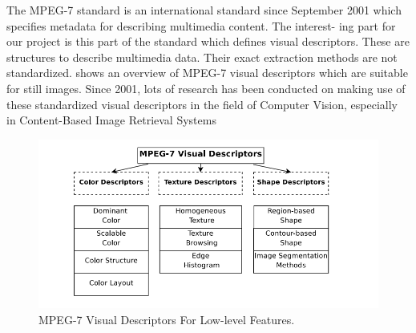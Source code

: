 The MPEG-7 standard\cite{Mpeg} is an international standard since September 2001
which speciﬁes metadata for describing multimedia content. The interest-
ing part for our project is this part of the standard which deﬁnes visual
descriptors. These are structures to describe multimedia data. Their exact
extraction methods are not standardized.  shows an overview of
MPEG-7 visual descriptors which are suitable for still images.
Since 2001, lots of research has been conducted on making use of these
standardized visual descriptors in the ﬁeld of Computer Vision, especially in
Content-Based Image Retrieval Systems 
\begin{figure}[h]
  \centering
  \includegraphics[width=6in]{Mpeg7}
  \caption  {MPEG-7 Visual Descriptors For Low-level Features.}
   \label{Mpeg7}
\end{figure}


